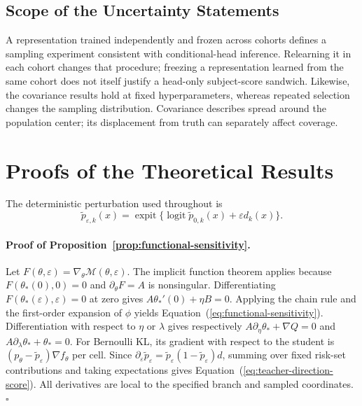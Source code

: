 \documentclass{article} %
\renewcommand{\eqref}[1]{\textup{(\ref{#1})}}
\DeclareMathOperator{\expit}{expit}
\DeclareMathOperator{\logit}{logit}
\begin{document}
\subsection{Scope of the Uncertainty Statements}
\label{sec:uncertainty-scope}
A representation trained independently and frozen across cohorts defines a sampling experiment consistent with conditional-head inference. Relearning it in each cohort changes that procedure; freezing a representation learned from the same cohort does not itself justify a head-only subject-score sandwich. Likewise, the covariance results hold at fixed hyperparameters, whereas repeated selection changes the sampling distribution. Covariance describes spread around the population center; its displacement from truth can separately affect coverage.

\section{Proofs of the Theoretical Results}
\label{app:proofs}

The deterministic perturbation used throughout is
\begin{equation}
\widetilde p_{\varepsilon,k}(x)=\expit\{\logit\widetilde p_{0,k}(x)+\varepsilon d_k(x)\}.
\label{eq:teacher-perturbation}
\end{equation}

\paragraph{Proof of Proposition~\ref{prop:functional-sensitivity}.}
Let $F(\theta,\varepsilon)=\nabla_\theta\mathcal M(\theta,\varepsilon)$. The implicit function theorem applies because $F(\theta_*(0),0)=0$ and $\partial_\theta F=A$ is nonsingular. Differentiating $F(\theta_*(\varepsilon),\varepsilon)=0$ at zero gives $A\theta_*'(0)+\eta B=0$. Applying the chain rule and the first-order expansion of $\phi$ yields Equation~\eqref{eq:functional-sensitivity}. Differentiation with respect to $\eta$ or $\lambda$ gives respectively $A\partial_\eta\theta_*+\nabla Q=0$ and $A\partial_\lambda\theta_*+\theta_*=0$. For Bernoulli KL, its gradient with respect to the student is $(p_\theta-\widetilde p_\varepsilon)\nabla f_\theta$ per cell. Since $\partial_\varepsilon\widetilde p_\varepsilon=\widetilde p_\varepsilon(1-\widetilde p_\varepsilon)d$, summing over fixed risk-set contributions and taking expectations gives Equation~\eqref{eq:teacher-direction-score}. All derivatives are local to the specified branch and sampled coordinates. \hfill$\square$
\end{document}
